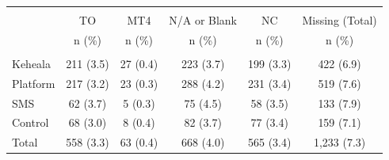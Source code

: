 \scriptsize{\begin{tabular}{lccccc}
\hline \hline \\[-8pt]
\rowcolor{yellow!15}            & TO             & MT4            & N/A or Blank   & NC             & Missing (Total) \\
\rowcolor{yellow!15}            & n (\%)         & n (\%)         & n (\%)         & n (\%)         & n (\%)         \\ \hline \\[-8pt]
Keheala    & 211 (3.5)   & 27 (0.4)   & 223 (3.7)   & 199 (3.3)   & 422 (6.9)   \\
[0.4em]
Platform   & 217 (3.2)   & 23 (0.3)   & 288 (4.2)   & 231 (3.4)   & 519 (7.6)   \\
[0.4em]
SMS        & 62 (3.7)   & 5 (0.3)   & 75 (4.5)   & 58 (3.5)   & 133 (7.9)   \\
[0.4em]
Control    & 68 (3.0)   & 8 (0.4)   & 82 (3.7)   & 77 (3.4)   & 159 (7.1)   \\
\hline
Total      & 558 (3.3)   & 63 (0.4)   & 668 (4.0)   & 565 (3.4)   & 1,233 (7.3)   \\ \hline \hline
\end{tabular}}